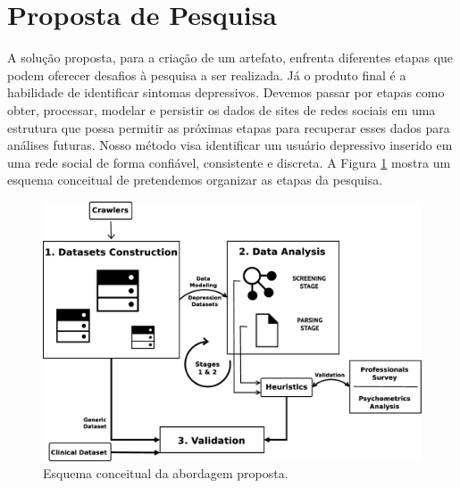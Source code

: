 \documentclass[11pt, notitlepage]{article} %
\begin{document}
\section*{Proposta de Pesquisa}

A solução proposta, para a criação de um artefato, enfrenta diferentes etapas que podem oferecer desafios à pesquisa a ser realizada. Já o produto final é a habilidade de identificar sintomas depressivos. Devemos passar por etapas como obter, processar, modelar e persistir os dados de sites de redes sociais em uma estrutura que possa permitir as próximas etapas para recuperar esses dados para análises futuras.
Nosso método visa identificar um usuário depressivo inserido em uma rede social de forma confiável, consistente e discreta. A Figura \ref{fig:proposalgraph} mostra um esquema conceitual de pretendemos organizar as etapas da pesquisa. 

\begin{figure}[!ht]
  \centering
  \includegraphics[keepaspectratio, width=.625\columnwidth]{Figures/conceptualModel.eps}
  \caption{Esquema conceitual da abordagem proposta.}
  \label{fig:proposalgraph}
\end{figure}
\end{document}
